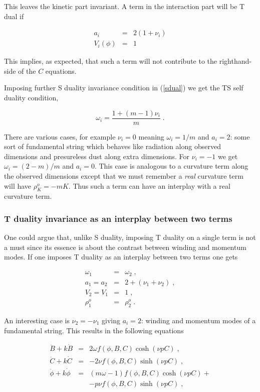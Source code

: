 \documentclass[aps,floatfix,twocolumn,amsmath]{revtex4}
\newcommand{\be}{\begin{equation}}
\newcommand{\ee}{\end{equation}}
\newcommand{\bea}{\begin{eqnarray}}
\newcommand{\eea}{\end{eqnarray}}
\begin{document}
This leaves the kinetic part invariant. A term in the interaction part will be T dual if

\begin{subequations}
\bea
a_{i}&=&2(1+\nu_{i})\\
V_{i}(\phi)&=&1
\eea
\end{subequations}

This implies, as expected, that such a term will not contribute to the righthand-side of the $C$ equations. 

Imposing further  S duality invariance condition in (\ref{sdual}) we get the TS self duality condition,

\be
\omega_{i}=\frac{1+(m-1)\nu_{i}}{m}\;.
\ee

There are various cases, for example $\nu_{i}=0$ meaning $\omega_{i}=1/m$ and $a_{i}=2$: some sort of fundamental string which behaves like radiation along observed dimensions and presureless dust along extra dimensions. For $\nu_{i}=-1$ we get $\omega_{i}=(2-m)/m$ and $a_{i}=0$. This case is analogous to a curvature term along the observed dimensions except that we must remember a {\em real} curvature term will have $\rho_{K}^{o}=-m K$. Thus such a term can have an interplay with a real curvature term.

\subsubsection{T duality invariance as an interplay between two terms}
One could argue that, unlike S duality, imposing T duality on a single term is not a must since its essence is about the contrast between winding and momentum modes. If one imposes T duality as an interplay between two terms one gets

\begin{subequations}
\bea
\omega_{1}&=&\omega_{2}\;,\\
a_{1}=a_{2}&=&2+(\nu_{1}+\nu_{2})\;,\\
V_{2}=V_{1}&=&1\;,\\
\rho_{1}^{o}&=&\rho_{2}^{o}\;.
\eea
\end{subequations}

\noindent An interesting case  is $\nu_{2}=-\nu_{1}$ giving $a_{i}=2$: winding and momentum modes of a fundamental string. This results in the following equations

\begin{subequations}
\bea
\ddot{B}+k\dot{B}&=& 2\omega f(\phi,B,C)\cosh(\nu pC)\;,\\
\ddot{C}+k\dot{C}&=& -2\nu f(\phi,B,C)\sinh(\nu pC)\;,\\
\ddot{\phi}+k\dot{\phi}&=& (m\omega-1)f(\phi,B,C)\cosh(\nu pC)+\nonumber\\
&&-p\nu f(\phi,B,C)\sinh(\nu pC)\;,
\eea
\end{subequations}
\end{document}
